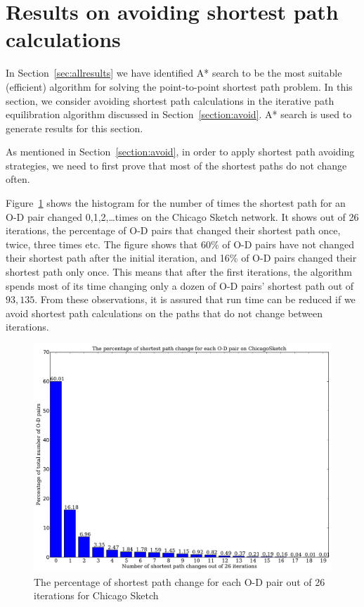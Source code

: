 \section{Results on avoiding shortest path calculations}
In Section~\ref{sec:allresults} we have identified A* search to be the most suitable (efficient) algorithm for solving the point-to-point shortest path problem.
In this section, we consider avoiding shortest path calculations in the iterative path equilibration algorithm discussed in Section~\ref{section:avoid}.
A* search is used to generate results for this section.

As mentioned in Section~\ref{section:avoid},
in order to apply shortest path avoiding strategies,
we need to first prove that most of the shortest paths do not change often.

Figure~\ref{fig:sp_change} shows 
the histogram for the number of times the shortest path for an O-D pair changed 0,1,2,\ldots times on the Chicago Sketch network.
It shows out of 26 iterations,
the percentage of O-D pairs that changed their shortest path once, twice, three times etc.
The figure shows that 60\% of O-D pairs have not changed their shortest path after the initial iteration,
and 16\% of O-D pairs changed their shortest path only once.
This means that after the first iterations,
the algorithm spends most of its time changing only a dozen of O-D pairs' shortest path out of $93{,}135$.
From these observations,
it is assured that run time can be reduced if we avoid shortest path calculations on the paths that do not change between iterations.

\begin{figure}[H]
    \centering
    \includegraphics[height=.5\textheight]{img/sp_change}
    \caption{The percentage of shortest path change for each O-D pair out of 26 iterations for Chicago Sketch}
    \label{fig:sp_change}
\end{figure}

